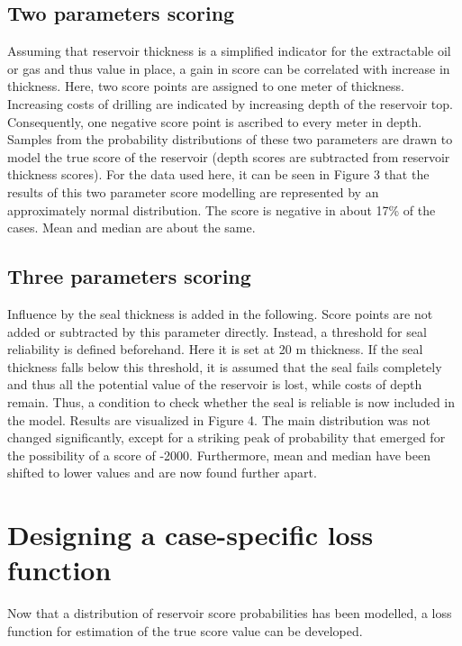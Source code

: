 	\subsection{Two parameters scoring}
	
	Assuming that reservoir thickness is a simplified indicator for the extractable oil or gas and thus value in place, a gain in score can be correlated with increase in thickness. Here, two score points are assigned to one meter of thickness. Increasing costs of drilling are indicated by increasing depth of the reservoir top. Consequently, one negative score point is ascribed to every meter in depth. Samples from the probability distributions of these two parameters are drawn to model the true score of the reservoir (depth scores are subtracted from reservoir thickness scores). For the data used here, it can be seen in Figure 3 that the results of this two parameter score modelling are represented by an approximately normal distribution. The score is negative in about 17\% of the cases. Mean and median are about the same.
	
	\subsection{Three parameters scoring}
	
	Influence by the seal thickness is added in the following. Score points are not added or subtracted by this parameter directly. Instead, a threshold for seal reliability is defined beforehand. Here it is set at 20 m thickness. If the seal thickness falls below this threshold, it is assumed that the seal fails completely and thus all the potential value of the reservoir is lost, while costs of depth remain. Thus, a condition to check whether the seal is reliable is now included in the model. Results are visualized in Figure 4. The main distribution was not changed significantly, except for a striking peak of probability that emerged for the possibility of a score of -2000. Furthermore, mean and median have been shifted to lower values and are now found further apart.
	
	\section{Designing a case-specific loss function}
	
	Now that a distribution of reservoir score probabilities has been modelled, a loss function for estimation of the true score value can be developed.
	
